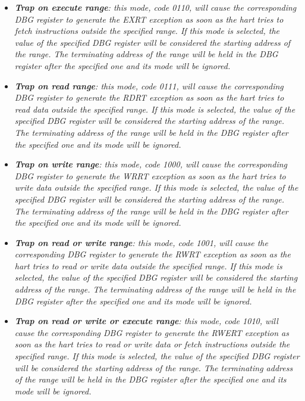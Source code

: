 \begin{itemize}
                \item \textit{\textbf{Trap on execute range}: this mode, code 0110, will cause the corresponding DBG register to generate the EXRT exception as soon as the hart tries to fetch instructions outside the specified range. If this mode is selected, the value of the specified DBG register will be considered the starting address of the range. The terminating address of the range will be held in the DBG register after the specified one and its mode will be ignored.}

                \item \textit{\textbf{Trap on read range}: this mode, code 0111, will cause the corresponding DBG register to generate the RDRT exception as soon as the hart tries to read data outside the specified range. If this mode is selected, the value of the specified DBG register will be considered the starting address of the range. The terminating address of the range will be held in the DBG register after the specified one and its mode will be ignored.}

                \item \textit{\textbf{Trap on write range}: this mode, code 1000, will cause the corresponding DBG register to generate the WRRT exception as soon as the hart tries to write data outside the specified range. If this mode is selected, the value of the specified DBG register will be considered the starting address of the range. The terminating address of the range will be held in the DBG register after the specified one and its mode will be ignored.}

                \item \textit{\textbf{Trap on read or write range}: this mode, code 1001, will cause the corresponding DBG register to generate the RWRT exception as soon as the hart tries to read or write data outside the specified range. If this mode is selected, the value of the specified DBG register will be considered the starting address of the range. The terminating address of the range will be held in the DBG register after the specified one and its mode will be ignored.}

                \item \textit{\textbf{Trap on read or write or execute range}: this mode, code 1010, will cause the corresponding DBG register to generate the RWERT exception as soon as the hart tries to read or write data or fetch instructions outside the specified range. If this mode is selected, the value of the specified DBG register will be considered the starting address of the range. The terminating address of the range will be held in the DBG register after the specified one and its mode will be ignored.}


\end{itemize}
